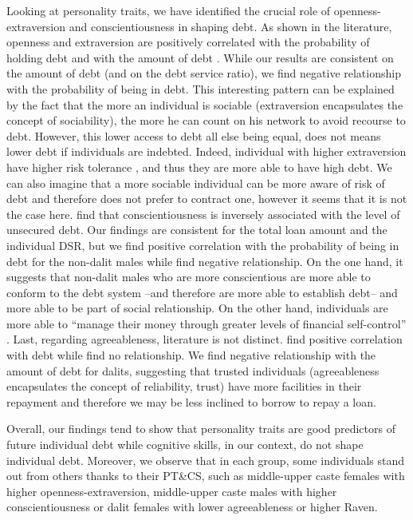 \documentclass[a4paper, 12pt, onecolumn]{article}
\newcommand{\aebe}{all else being equal}
\newcommand{\PTCS}{PT\&CS}
\begin{document}
Looking at personality traits, we have identified the crucial role of openness-extraversion and conscientiousness in shaping debt.
As shown in the literature, openness and extraversion are positively correlated with the probability of holding debt and with the amount of debt \citep{Brown2014}.
While our results are consistent on the amount of debt (and on the debt service ratio), we find negative relationship with the probability of being in debt.
This interesting pattern can be explained by the fact that the more an individual is sociable (extraversion encapsulates the concept of sociability), the more he can count on his network to avoid recourse to debt.
However, this lower access to debt \aebe, does not means lower debt if individuals are indebted.
Indeed, individual with higher extraversion have higher risk tolerance \citep{Pinjisakikool2017b}, and thus they are more able to have high debt.
We can also imagine that a more sociable individual can be more aware of risk of debt and therefore does not prefer to contract one, however it seems that it is not the case here.
\cite{Brown2014, Donnelly2012} find that conscientiousness is inversely associated with the level of unsecured debt.
Our findings are consistent for the total loan amount and the individual DSR, but we find positive correlation with the probability of being in debt for the non-dalit males while \cite{Nyhus2001, Brown2014} find negative relationship.
On the one hand, it suggests that non-dalit males who are more conscientious are more able to conform \citep{DeYoung2002} to the debt system --and therefore are more able to establish debt-- and more able to be part of social relationship.
On the other hand, individuals are more able to ``manage their money through greater levels of financial self-control'' \citep{Brown2014}.
Last, regarding agreeableness, literature is not distinct.
\cite{Brown2014} find positive correlation with debt while \cite{Nyhus2001} find no relationship.
We find negative relationship with the amount of debt for dalits, suggesting that trusted individuals (agreeableness encapsulates the concept of reliability, trust) have more facilities in their repayment and therefore we may be less inclined to borrow to repay a loan. 

Overall, our findings tend to show that personality traits are good predictors of future individual debt while cognitive skills, in our context, do not shape individual debt.
Moreover, we observe that in each group, some individuals stand out from others thanks to their \PTCS, such as middle-upper caste females with higher openness-extraversion, middle-upper caste males with higher conscientiousness or dalit females with lower agreeableness or higher Raven.
\end{document}
